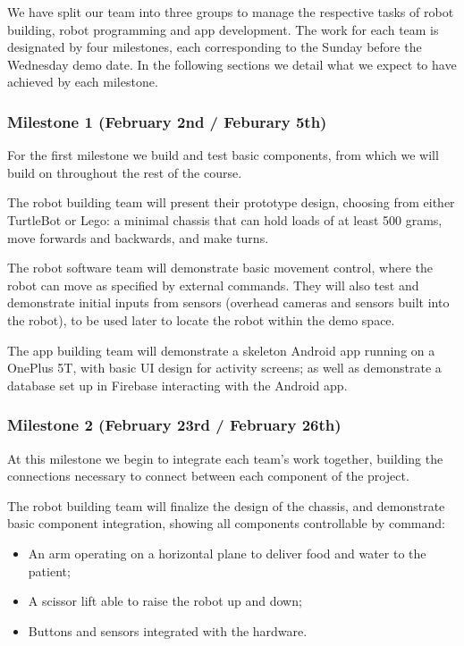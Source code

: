 \documentclass{article}
\begin{document}
We have split our team into three groups to manage the respective tasks of robot building, robot programming and app development. The work for each team is designated by four milestones, each corresponding to the Sunday before the Wednesday demo date. In the following sections we detail what we expect to have achieved by each milestone. 

\subsubsection{Milestone 1 (February 2nd / Feburary 5th)}
For the first milestone we build and test basic components, from which we will build on throughout the rest of the course. 

The robot building team will present their prototype design, choosing from either TurtleBot or Lego: a minimal chassis that can hold loads of at least 500 grams, move forwards and backwards, and make turns.

The robot software team will demonstrate basic movement control, where the robot can move as specified by external commands. They will also test and demonstrate initial inputs from sensors (overhead cameras and sensors built into the robot), to be used later to locate the robot within the demo space.

The app building team will demonstrate a skeleton Android app running on a OnePlus 5T, with basic UI design for activity screens; as well as demonstrate a database set up in Firebase interacting with the Android app. 

\subsubsection{Milestone 2 (February 23rd / February 26th)}
At this milestone we begin to integrate each team's work together, building the connections necessary to connect between each component of the project. 

The robot building team will finalize the design of the chassis, and demonstrate basic component integration, showing all components controllable by command:
\begin{itemize}
\item An arm operating on a horizontal plane to deliver food and water to the patient;
\item A scissor lift able to raise the robot up and down;
\item Buttons and sensors integrated with the hardware.
\end{itemize}
\end{document}
